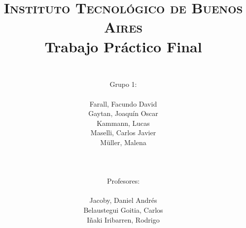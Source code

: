 




	\title{
		\normalfont \normalsize \textsc{Instituto Tecnol\'ogico de Buenos Aires} \\ [25pt]
		\huge Trabajo Pr\'actico Final\\
		\author{
			\\Grupo 1:\\\\Farall, Facundo David\\Gaytan, Joaqu\'in Oscar\\Kammann, Lucas\\Maselli, Carlos Javier\\M\"uller, Malena \\ \\ \\ \\
			Profesores: \\\\ Jacoby, Daniel Andrés\\Belaustegui Goitia, Carlos\\Iñaki Iribarren, Rodrigo \\ \\ \\ 
		} 		
	}
	\maketitle
	\newpage

	\tableofcontents

	\newpage
	
	\newpage


